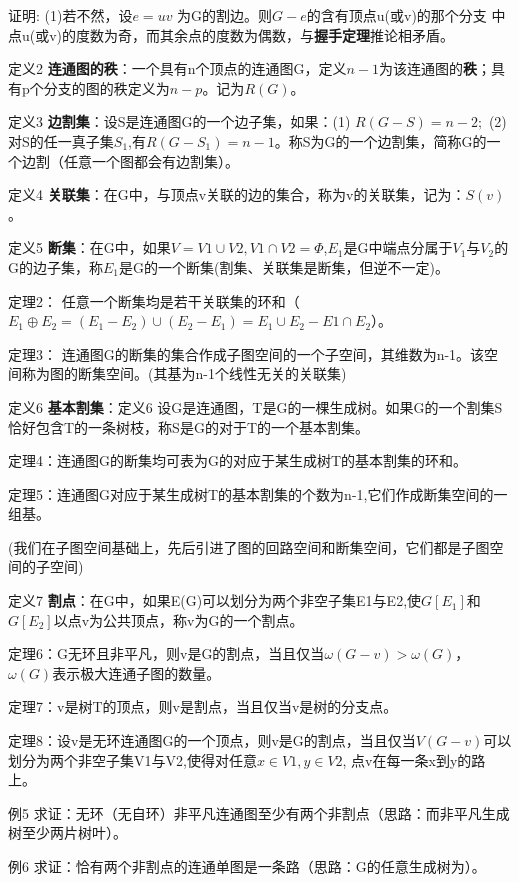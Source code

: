 \documentclass{article}
\begin{document}
证明: (1)若不然，设$e=uv$ 为G的割边。则$G-e$的含有顶点u(或v)的那个分支
中点u(或v)的度数为奇，而其余点的度数为偶数，与\textbf{握手定理}推论相矛盾。

定义2 \textbf{连通图的秩}：一个具有n个顶点的连通图G，定义$n-1$为该连通图的\textbf{秩}；具有p个分支的图的秩定义为$n-p$。记为$R(G)$。

定义3 \textbf{边割集}：设S是连通图G的一个边子集，如果：(1) $R (G-S) = n-2;$ (2) 对S的任一真子集$S_1$,有$R(G-S_1) = n-1$。称S为G的一个边割集，简称G的一个边割（任意一个图都会有边割集）。

定义4 \textbf{关联集}：在G中，与顶点v关联的边的集合，称为v的关联集，记为：$S (v)$。

定义5 \textbf{断集}：在G中，如果$V=V1 \cup V2,V1 \cap V2=\Phi$,$E_1$是G中端点分属于$V_1$与$V_2$的G的边子集，称$E_1$是G的一个断集(割集、关联集是断集，但逆不一定)。

定理2： 任意一个断集均是若干关联集的环和（$E_1 \oplus E_2 =  (E_1 - E_2) \cup  (E_2 - E_1) = E_1 \cup E_2 - E1 \cap E_2$）。

定理3： 连通图G的断集的集合作成子图空间的一个子空间，其维数为n-1。该空间称为图的断集空间。(其基为n-1个线性无关的关联集)

定义6 \textbf{基本割集}：定义6 设G是连通图，T是G的一棵生成树。如果G的一个割集S恰好包含T的一条树枝，称S是G的对于T的一个基本割集。

定理4：连通图G的断集均可表为G的对应于某生成树T的基本割集的环和。

定理5：连通图G对应于某生成树T的基本割集的个数为n-1,它们作成断集空间的一组基。

(我们在子图空间基础上，先后引进了图的回路空间和断集空间，它们都是子图空间的子空间)

定义7 \textbf{割点}：在G中，如果E(G)可以划分为两个非空子集E1与E2,使$G[E_1]$和$G[E_2]$以点v为公共顶点，称v为G的一个割点。

定理6：G无环且非平凡，则v是G的割点，当且仅当$\omega(G-v) > \omega(G)$，$\omega(G)$表示极大连通子图的数量。

定理7：v是树T的顶点，则v是割点，当且仅当v是树的分支点。

定理8：设v是无环连通图G的一个顶点，则v是G的割点，当且仅当$V(G-v)$可以划分为两个非空子集V1与V2,使得对任意$x \in V1, y \in V2$, 点v在每一条x到y的路上。

例5 求证：无环（无自环）非平凡连通图至少有两个非割点（思路：而非平凡生成树至少两片树叶）。

例6 求证：恰有两个非割点的连通单图是一条路（思路：G的任意生成树为）。
\end{document}
